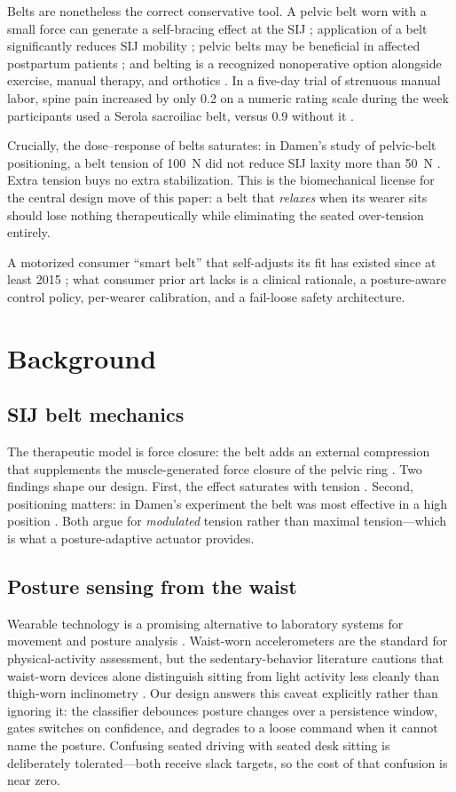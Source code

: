 \documentclass[11pt]{article}
\begin{document}
Belts are nonetheless the correct conservative tool. A pelvic belt worn
with a small force can generate a self-bracing effect at the SIJ
\cite{ref19}; application of a belt significantly reduces SIJ mobility
\cite{ref19}; pelvic belts may be beneficial in affected postpartum
patients \cite{ref3}; and belting is a recognized nonoperative option
alongside exercise, manual therapy, and orthotics \cite{ref10}. In a
five-day trial of strenuous manual labor, spine pain increased by only
0.2 on a numeric rating scale during the week participants used a
Serola sacroiliac belt, versus 0.9 without it \cite{ref8}.

Crucially, the dose--response of belts saturates: in Damen's study of
pelvic-belt positioning, a belt tension of 100~N did not reduce SIJ
laxity more than 50~N \cite{ref4}. Extra tension buys no extra
stabilization. This is the biomechanical license for the central design
move of this paper: a belt that \emph{relaxes} when its wearer sits
should lose nothing therapeutically while eliminating the seated
over-tension entirely.

A motorized consumer ``smart belt'' that self-adjusts its fit has
existed since at least 2015 \cite{ref16}; what consumer prior art lacks
is a clinical rationale, a posture-aware control policy, per-wearer
calibration, and a fail-loose safety architecture.

\section{Background}
\subsection{SIJ belt mechanics}
The therapeutic model is force closure: the belt adds an external
compression that supplements the muscle-generated force closure of the
pelvic ring \cite{ref19}. Two findings shape our design. First, the
effect saturates with tension \cite{ref4}. Second, positioning matters:
in Damen's experiment the belt was most effective in a high position
\cite{ref4}. Both argue for \emph{modulated} tension rather than
maximal tension---which is what a posture-adaptive actuator provides.

\subsection{Posture sensing from the waist}
Wearable technology is a promising alternative to laboratory systems
for movement and posture analysis \cite{ref13}. Waist-worn
accelerometers are the standard for physical-activity assessment, but
the sedentary-behavior literature cautions that waist-worn devices
alone distinguish sitting from light activity less cleanly than
thigh-worn inclinometry \cite{ref23}. Our design answers this caveat
explicitly rather than ignoring it: the classifier debounces posture
changes over a persistence window, gates switches on confidence, and
degrades to a loose command when it cannot name the posture. Confusing
seated driving with seated desk sitting is deliberately tolerated---both
receive slack targets, so the cost of that confusion is near zero.
\end{document}
